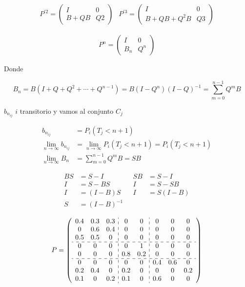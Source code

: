 \[
    \begin{array}{cc}
    P^{'2} = \begin{pmatrix} I&0\\ B+QB&Q{2} \end{pmatrix} & 
    P^{'3} = \begin{pmatrix} I&0\\B+QB+Q^{2}B&Q{3} \end{pmatrix}
    \end{array}
\]

\begin{align*}
    P^{n} = \begin{pmatrix}
        I & 0 \\
        B_{n} & Q^{n}
    \end{pmatrix}
\end{align*}

Donde 

\[
    B_{n} = B(I + Q + Q^{2} + \cdots + Q^{n-1}) = B(I - Q^{n})(I - Q)^{-1} = \sum_{m=0}^{n-1} Q^{m} B
\]

$b_{n_{ij}}$ $i$ transitorio y vamos al conjunto $C_{j}$

\begin{align*}
    b_{n_{ij}} &  = P_{i} (T_{j} < n+1) \\
    \lim_{n \to \infty} b_{n_{ij}} & = \lim_{n \to \infty} P_{i} (T_{j} < n+1) = P_{i} (T_{j} < n+1)\\
    \lim_{n \to \infty} B_{n} & = \sum_{m=0}^{n-1} Q^{m} B = SB
\end{align*}

\begin{align*}
BS &= S - I \quad & SB &= S - I \\
I &= S - BS \quad & I &= S - SB \\
I &= (I - B)S \quad & I &= S(I - B) \\
S &= (I - B)^{-1}
\end{align*}

\[
P =
\left(
\begin{array}{ccc:cc:ccc}
0.4 & 0.3 & 0.3 & 0 & 0 & 0 & 0 & 0 \\
0 & 0.6 & 0.4 & 0 & 0 & 0 & 0 & 0 \\
0.5 & 0.5 & 0 & 0 & 0 & 0 & 0 & 0 \\
\hdashline 
0 & 0 & 0 & 0 & 1 & 0 & 0 & 0 \\
0 & 0 & 0 & 0.8 & 0.2 & 0 & 0 & 0 \\
\hdashline 
0 & 0 & 0 & 0 & 0 & 0.4 & 0.6 & 0 \\
0.2 & 0.4 & 0 & 0.2 & 0 & 0 & 0 & 0.2 \\
0.1 & 0 & 0.2 & 0.1 & 0 & 0.6 & 0 & 0 \\
\end{array}
\right)
\]

